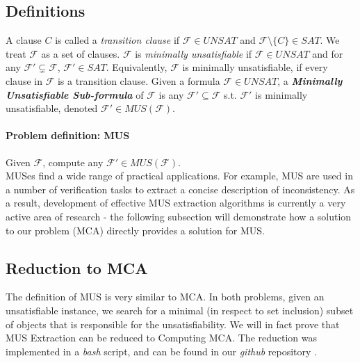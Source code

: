 \documentclass[]{article}
\begin{document}
	\subsection{Definitions} A clause $ C $ is called a \textit{transition clause} if $ \mathcal{F} \in UNSAT$ and $ \mathcal{F} \setminus \{C\} \in SAT $.
	We treat $ \mathcal{F} $ as a set of clauses. $ \mathcal{F} $ is \textit{minimally unsatisfiable} if $ \mathcal{F} \in UNSAT $ and for any $ \mathcal{F}' \subsetneq \mathcal{F} $, $ \mathcal{F}' \in SAT$. Equivalently, $ \mathcal{F} $ is minimally unsatisfiable, if every clause in $ \mathcal{F} $ is a transition clause. Given a formula $ \mathcal{F} \in UNSAT $, a \textbf{\textit{Minimally Unsatisfiable Sub-formula}} of $ \mathcal{F} $ is any $ \mathcal{F}' \subseteq \mathcal{F} $ s.t. $ \mathcal{F}' $ is minimally unsatisfiable, denoted $ \mathcal{F}' \in MUS(\mathcal{F}) $.

	\paragraph{Problem definition: MUS} Given $ \mathcal{F} $, compute any $ \mathcal{F}' \in MUS(\mathcal{F}) $. \\
	
	MUSes find a wide range of practical applications. For example, MUS are used in a number of verification tasks to extract a concise description of inconsistency. As a result, development of effective MUS extraction algorithms is currently a very active area of research\cite{Rotation} - the following subsection will demonstrate how a solution to our problem (MCA) directly provides a solution for MUS.
	
	\subsection{Reduction to MCA} The definition of MUS is very similar to MCA. In both problems, given an unsatisfiable instance, we search for a minimal (in respect to set inclusion) subset of objects that is responsible for the unsatisfiability. We will in fact prove that MUS Extraction can be reduced to Computing MCA. The reduction was implemented in a \textit{bash} script, and can be found in our \textit{github} repository \cite{MCArep}.
	
\end{document}

